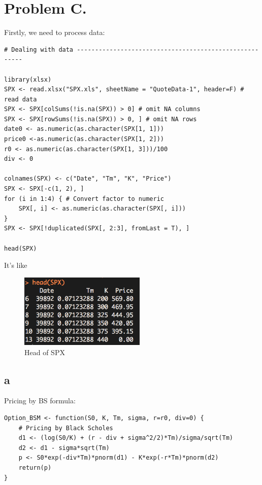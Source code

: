 \documentclass{article}
\begin{document}
\section{Problem C.}
Firstly, we need to process data:
\begin{verbatim}
# Dealing with data -------------------------------------------------------

library(xlsx)
SPX <- read.xlsx("SPX.xls", sheetName = "QuoteData-1", header=F) # read data
SPX <- SPX[colSums(!is.na(SPX)) > 0] # omit NA columns
SPX <- SPX[rowSums(!is.na(SPX)) > 0, ] # omit NA rows
date0 <- as.numeric(as.character(SPX[1, 1])) 
price0 <-as.numeric(as.character(SPX[1, 2])) 
r0 <- as.numeric(as.character(SPX[1, 3]))/100 
div <- 0

colnames(SPX) <- c("Date", "Tm", "K", "Price")
SPX <- SPX[-c(1, 2), ]
for (i in 1:4) { # Convert factor to numeric
    SPX[, i] <- as.numeric(as.character(SPX[, i]))
}
SPX <- SPX[!duplicated(SPX[, 2:3], fromLast = T), ]

head(SPX)
\end{verbatim}

It's like

\begin{figure}[h] 
\begin{center} 
\includegraphics[width = 6cm]{SPX.png}  
\caption{Head of SPX} 
\end{center} 
\end{figure}

\subsection{a}

Pricing by BS formula:
\begin{verbatim}
Option_BSM <- function(S0, K, Tm, sigma, r=r0, div=0) {
    # Pricing by Black Scholes
    d1 <- (log(S0/K) + (r - div + sigma^2/2)*Tm)/sigma/sqrt(Tm)
    d2 <- d1 - sigma*sqrt(Tm)
    p <- S0*exp(-div*Tm)*pnorm(d1) - K*exp(-r*Tm)*pnorm(d2)
    return(p)
}
\end{verbatim}
\end{document}
